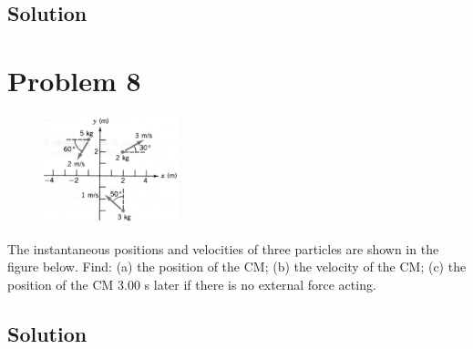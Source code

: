 \documentclass[12pt]{article}
\begin{document}
\subsection*{Solution}


\pagebreak
\section*{Problem 8}
\begin{figure}
    \vspace{-30pt}
    \includegraphics[width=0.35\textwidth]{graph_8.png} 
\end{figure}
The instantaneous positions and velocities of three particles are shown in the figure below. Find: (a)
the position of the CM; (b) the velocity of the CM; (c) the position of the CM 3.00 s later if there is no
external force acting.

\subsection*{Solution}
\end{document}
